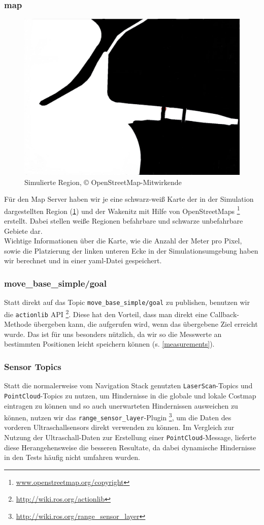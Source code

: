 \documentclass[11pt]{article}
\begin{document}
\subsubsection{map}

\begin{figure}
    \centering
	\includegraphics[width=0.7\linewidth]{diluvio.jpg}
	\caption{Simulierte Region, © OpenStreetMap-Mitwirkende}
	\label{diluvio}
\end{figure}

Für den Map Server haben wir je eine schwarz-weiß Karte der in der Simulation dargestellten Region (\ref{diluvio}) und der Wakenitz mit Hilfe von OpenStreetMaps \footnote{\url{www.openstreetmap.org/copyright}} erstellt. Dabei stellen weiße Regionen befahrbare und schwarze unbefahrbare Gebiete dar.\\
Wichtige Informationen über die Karte, wie die Anzahl der Meter pro Pixel, sowie die Platzierung der linken unteren Ecke in der Simulationsumgebung haben wir berechnet und in einer yaml-Datei gespeichert.

\subsubsection{move\_base\_simple/goal} \label{goal}
Statt direkt auf das Topic \texttt{move\_base\_simple/goal} zu publishen, benutzen wir die \texttt{actionlib} API \footnote{\url{http://wiki.ros.org/actionlib}}. Diese hat den Vorteil, dass man direkt eine Callback-Methode übergeben kann, die aufgerufen wird, wenn das übergebene Ziel erreicht wurde. Das ist für uns besonders nützlich, da wir so die Messwerte an bestimmten Positionen leicht speichern können (s. \ref{measurements}).

\subsubsection{Sensor Topics}
Statt die normalerweise vom Navigation Stack genutzten \texttt{LaserScan}-Topics und \texttt{PointCloud}-Topics zu nutzen, um Hindernisse in die globale und lokale Costmap eintragen zu können und so auch unerwarteten Hindernissen ausweichen zu können, nutzen wir das \texttt{range\_sensor\_layer}-Plugin \footnote{\url{http://wiki.ros.org/range_sensor_layer}}, um die Daten des vorderen Ultraschallsensors direkt verwenden zu können. Im Vergleich zur Nutzung der Ultraschall-Daten zur Erstellung einer \texttt{PointCloud}-Message, lieferte diese Herangehensweise die besseren Resultate, da dabei dynamische Hindernisse in den Tests häufig nicht umfahren wurden.
\end{document}
